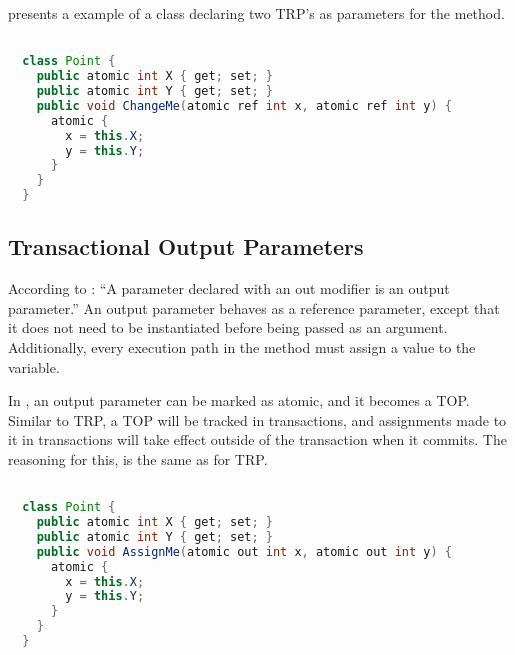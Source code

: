  presents a example of a  class declaring two \ac{TRP}'s as parameters for the  method.

\begin{lstlisting}[label=lst:atomic_ref,
  caption={Transactional Reference Parameter},
  language=Java,  
  showspaces=false,
  showtabs=false,
  breaklines=true,
  showstringspaces=false,
  breakatwhitespace=true,
  commentstyle=\color{greencomments},
  keywordstyle=\color{bluekeywords},
  stringstyle=\color{redstrings},
  morekeywords={atomic, retry, orElse, var, get, set}]  % Start your code-block

  class Point {
    public atomic int X { get; set; }
    public atomic int Y { get; set; }
    public void ChangeMe(atomic ref int x, atomic ref int y) {
      atomic { 
        x = this.X;
        y = this.Y;
      }
    }    
  }
\end{lstlisting}

\subsection{Transactional Output Parameters}
According to \cite[p. 97]{csharp2013specificaiton}: ``A parameter declared with an out modifier is an output parameter.'' An output parameter behaves as a reference parameter, except that it does not need to be instantiated before being passed as an argument. Additionally, every execution path in the method must assign a value to the variable\cite[p. 42]{sestoft2011c}. 

In \stmnamesp, an output parameter can be marked as atomic, and it becomes a \ac{TOP}. Similar to \ac{TRP}, a \ac{TOP} will be tracked in transactions, and assignments made to it in transactions will take effect outside of the transaction when it commits. The reasoning for this, is the same as for \ac{TRP}.


\begin{lstlisting}[label=lst:atomic_out,
  caption={Transactional Output Parameter},
  language=Java,  
  showspaces=false,
  showtabs=false,
  breaklines=true,
  showstringspaces=false,
  breakatwhitespace=true,
  commentstyle=\color{greencomments},
  keywordstyle=\color{bluekeywords},
  stringstyle=\color{redstrings},
  morekeywords={atomic, retry, orElse, var, get, set}]  % Start your code-block

  class Point {
    public atomic int X { get; set; }
    public atomic int Y { get; set; }
    public void AssignMe(atomic out int x, atomic out int y) {
      atomic { 
        x = this.X;
        y = this.Y;
      }
    }    
  }
\end{lstlisting}

